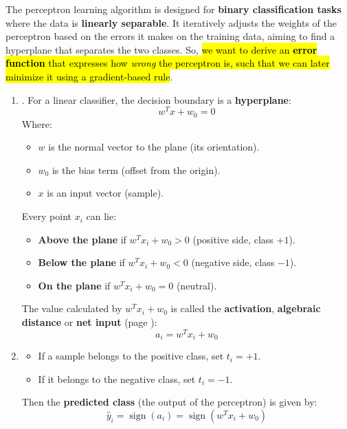 \highspace
The perceptron learning algorithm is designed for \textbf{binary classification tasks} where the data is \textbf{linearly separable}. It iteratively adjusts the weights of the perceptron based on the errors it makes on the training data, aiming to find a hyperplane that separates the two classes. So, \hl{we want to derive an \textbf{error function} that expresses how \emph{wrong} the perceptron is, such that we can later minimize it using a gradient-based rule}.
\begin{enumerate}
    \item {}. For a linear classifier, the decision boundary is a \textbf{hyperplane}:
    \begin{equation*}
        w^{T} x + w_{0} = 0
    \end{equation*}
    Where:
    \begin{itemize}
        \item $w$ is the normal vector to the plane (its orientation).
        \item $w_{0}$ is the bias term (offset from the origin).
        \item $x$ is an input vector (sample).
    \end{itemize}
    Every point $x_i$ can lie:
    \begin{itemize}
        \item \textbf{Above the plane} if $w^{T} x_i + w_{0} > 0$ (positive side, class $+1$).
        \item \textbf{Below the plane} if $w^{T} x_i + w_{0} < 0$ (negative side, class $-1$).
        \item \textbf{On the plane} if $w^{T} x_i + w_{0} = 0$ (neutral).
    \end{itemize}
    The value calculated by $w^{T} x_i + w_{0}$ is called the \textbf{activation}, \textbf{algebraic distance} or \textbf{net input} (page \pageref{eq:net-input}):
    \begin{equation*}
        a_i = w^{T} x_i + w_{0}
    \end{equation*}
    

    \item {}
    \begin{itemize}
        \item If a sample belongs to the positive class, set $t_i = +1$.
        \item If it belongs to the negative class, set $t_i = -1$.
    \end{itemize}
    Then the \textbf{predicted class} (the output of the perceptron) is given by:
    \begin{equation*}
        \hat{y}_i = \operatorname{sign}\left(a_i\right) = \operatorname{sign}\left(w^{T} x_i + w_{0}\right)
    \end{equation*}
    


\end{enumerate}
